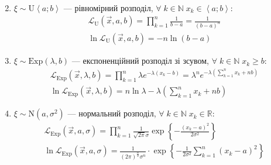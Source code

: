 \begin{enumerate}
\begin{gather*}
    \end{gather*}
    \item $\xi \sim \mathrm{U}\left< a; b\right>$ --- рівномірний розподіл, $\forall \; k \in \mathbb{N} \; x_k \in \left< a; b\right>$:
    \begin{gather*}
        \mathcal{L}_{\mathrm{U}}(\vec{x}, a, b) = \prod\limits_{k=1}^n \frac{1}{b-a} = \frac{1}{(b-a)^n} \\
        \ln\mathcal{L}_{\mathrm{U}}(\vec{x}, a, b) = -n \ln{(b-a)}
    \end{gather*} 
    \item $\xi \sim \mathrm{Exp}(\lambda, b)$ --- експоненційний розподіл зі зсувом, $\forall \; k \in \mathbb{N} \; x_k \geq b$:
    \begin{gather*}
        \mathcal{L}_{\mathrm{Exp}}(\vec{x}, \lambda, b) = \prod\limits_{k=1}^n \lambda e^{-\lambda (x_k-b)} = \lambda^n e^{-\lambda\left(\sum\limits_{k=1}^n x_k + n b\right)} \\
        \ln \mathcal{L}_{\mathrm{Exp}}(\vec{x}, \lambda, b) = n \ln \lambda - \lambda\left(\sum\limits_{k=1}^n x_k + n b\right)
    \end{gather*}
    \item $\xi \sim \mathrm{N}(a, \sigma^2)$ --- нормальний розподіл, $\forall \; k \in \mathbb{N} \; x_k \in \mathbb{R}$:
    \begin{gather*}
        \mathcal{L}_{\mathrm{Exp}}(\vec{x}, a, \sigma) = \prod\limits_{k=1}^n \frac{1}{\sqrt{2\pi}\sigma} \exp\left\{-\frac{(x_k - a)^2}{2\sigma^2}\right\} \\
        \ln \mathcal{L}_{\mathrm{Exp}}(\vec{x}, a, \sigma) = \frac{1}{(2\pi)^{\frac{n}{2}} \sigma^n} \cdot \exp\left\{-\frac{1}{2\sigma^2}\sum\limits_{k=1}^n (x_k - a)^2\right\}
    \end{gather*}
\end{enumerate}

